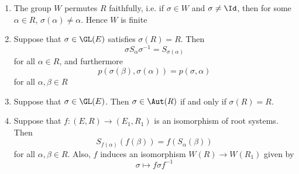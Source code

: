 \documentclass[x11names,reqno,14pt]{extarticle}
\begin{document}
\begin{enumerate}[label=(\alph*)]

\item The group $W$ permutes $R$ faithfully, i.e. if $\sigma\in W$ and $\sigma\neq\Id$, then for some $\alpha \in R$, $\sigma(\alpha)\neq\alpha$. Hence $W$ is finite

\item Suppose that $\sigma\in\GL(E)$ satisfies $\sigma(R) = R$. Then 
\[
\sigma S_\alpha\sigma^{-1} = S_{\sigma(\alpha)}
\]
for all $\alpha\in R$, and furthermore 
\[
p(\sigma(\beta),\sigma(\alpha)) = p(\sigma,\alpha)
\]
for all $\alpha,\beta\in R$

\item Suppose that $\sigma\in\GL(E)$. Then $\sigma\in\Aut(R)$ if and only if $\sigma(R) = R$. 

\item Suppose that $f:(E,R)\to(E_1,R_1)$ is an isomorphism of root systems. Then
\[
S_{f(\alpha)}(f(\beta))  = f(S_{\alpha}(\beta))
\]
for all $\alpha,\beta\in R$. Also, $f$ induces an isomorphism $W(R)\to W(R_1)$ given by 
\[
\sigma\mapsto f\sigma f^{-1}
\]

\end{enumerate}
\end{document}
